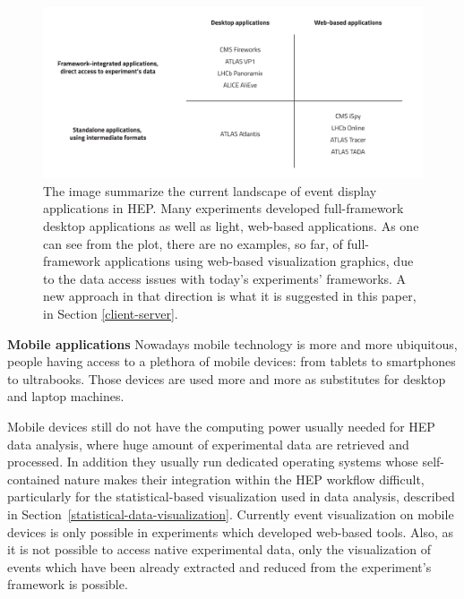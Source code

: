 \documentclass[12pt,a4paper]{article}
\begin{document}
\begin{figure}
	\centering
	\includegraphics[width=0.95\linewidth]{img/Current_Visualization_Landscape_v3}
	\caption[Current landscape of event display applications in HEP]{The image summarize the current landscape of event display applications in HEP. Many experiments developed full-framework desktop applications as well as light, web-based applications. As one can see from the plot, there are no examples, so far, of full-framework applications using web-based visualization graphics, due to the data access issues with today's experiments' frameworks. A new approach in that direction is what it is suggested in this paper, in Section \ref{client-server}.}
	\label{fig:currentvisualizationlandscape}
\end{figure}





{\bf Mobile applications} Nowadays mobile technology is more and more ubiquitous, people having access to a plethora of mobile devices: from tablets to
smartphones to ultrabooks. Those devices are used more and more as substitutes for desktop and laptop machines.


Mobile devices still do not have the computing power usually needed for HEP data analysis, where huge amount of experimental data
are retrieved and processed. In addition they usually run dedicated operating systems whose self-contained nature
makes their integration within the HEP workflow difficult, particularly for the statistical-based visualization used in
data analysis, described in Section~\ref{statistical-data-visualization}. Currently event visualization on mobile devices is only
possible in experiments which developed web-based tools. Also, as it is not possible to access  native experimental data, only the visualization of events which have been already
extracted and reduced from the experiment's framework is possible.
\end{document}
